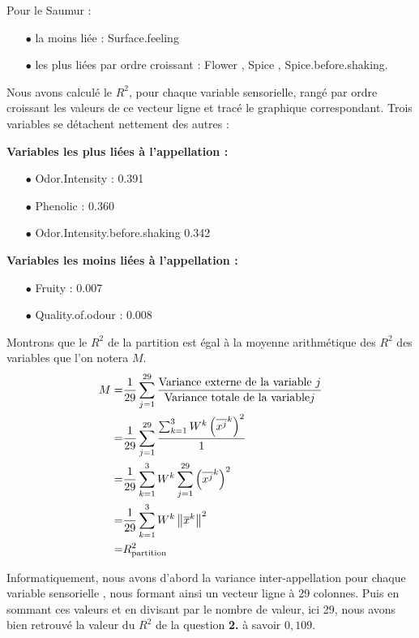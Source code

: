 \documentclass{article}
\begin{document}
\begin{enumerate}
Pour le Saumur :
\begin{itemize}
\item[$\bullet$] la moins liée : Surface.feeling 
\item[$\bullet$] les plus liées par ordre croissant : Flower , Spice , Spice.before.shaking. 
\end{itemize}

Nous avons calculé le $R^2$, pour chaque variable sensorielle, rangé par ordre croissant les valeurs de ce vecteur ligne et tracé le graphique correspondant.  Trois variables se détachent nettement des autres :

\textbf{Variables les plus liées à l'appellation :} 
	\begin{itemize}
	\item[$\bullet$] Odor.Intensity : 0.391
	\item[$\bullet$] Phenolic : 0.360
	\item[$\bullet$] Odor.Intensity.before.shaking 0.342
	\end{itemize}
	
\textbf{Variables les moins liées à l'appellation :}

\begin{itemize}
\item[$\bullet$] Fruity : 0.007
\item[$\bullet$] Quality.of.odour : 0.008 
\end{itemize}




Montrons que le $R^2$ de la partition est égal à la moyenne arithmétique des $R^2$ des variables que l'on notera $M$. 
\begin{align*}
M=& \frac{1}{29} \sum_{j=1}^{29} \frac{\text{Variance externe de la variable } j }{\text{Variance totale de la variable} j} \\ 
 =& \frac{1}{29} \sum_{j=1}^{29} \frac{\sum_{k=1}^3 W^k\left(\overline{x^j}^k\right)^2}{1} \\
  =&\frac{1}{29} \sum_{k=1}^3  W^k \sum_{j=1}^{29} \left(\overline{x^j}^k\right)^2 \\
   =& \frac{1}{29} \sum_{k=1}^3 W^k \left\| \overline{x}^k\right\|^2\\
 =& R^2_{\text{partition}}
\end{align*}

Informatiquement, nous avons d'abord la variance inter-appellation pour chaque variable sensorielle , nous formant ainsi un vecteur ligne à 29 colonnes. Puis en sommant ces valeurs et en divisant par le nombre de valeur, ici 29, nous avons bien retrouvé la valeur du $R^2$ de la question \textbf{2.} à savoir $0,109$.
\end{enumerate}
\end{document}
